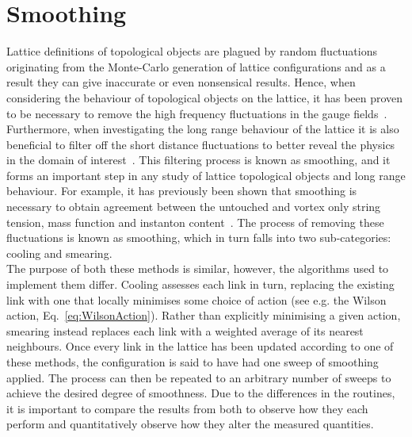 
\chapter{Smoothing}\label{chapter:Smoothing}
\ifpdf
    \graphicspath{{Chapter5/Figs/Raster/}{Chapter5/Figs/PDF/}{Chapter5/Figs/}}
\else
    \graphicspath{{Chapter5/Figs/Vector/}{Chapter5/Figs/}}
\fi

Lattice definitions of topological objects are plagued by random fluctuations originating from the Monte-Carlo generation of lattice configurations and as a result they can give inaccurate or even nonsensical results. Hence, when considering the behaviour of topological objects on the lattice, it has been proven to be necessary to remove the high frequency fluctuations in the gauge fields~\cite{Bonnet:2000dc}. Furthermore, when investigating the long range behaviour of the lattice it is also beneficial to filter off the short distance fluctuations to better reveal the physics in the domain of interest~\cite{Moran:2008ra}. This filtering process is known as smoothing, and it forms an important step in any study of lattice topological objects and long range behaviour. For example, it has previously been shown that smoothing is necessary to obtain agreement between the untouched and vortex only string tension, mass function and instanton content~\cite{Trewartha:2015ida,Trewartha:2015nna,Trewartha:2017ive}. The process of removing these fluctuations is known as smoothing, which in turn falls into two sub-categories: cooling and smearing.\\

The purpose of both these methods is similar, however, the algorithms used to implement them differ. Cooling assesses each link in turn, replacing the existing link with one that locally minimises some choice of action (see e.g. the Wilson action, Eq.~\ref{eq:WilsonAction}). Rather than explicitly minimising a given action, smearing  instead replaces each link with a weighted average of its nearest neighbours. Once every link in the lattice has been updated according to one of these methods, the configuration is said to have had one sweep of smoothing applied. The process can then be repeated to an arbitrary number of sweeps to achieve the desired degree of smoothness.  Due to the differences in the routines, it is important to compare the results from both to observe how they each perform and quantitatively observe how they alter the measured quantities.



